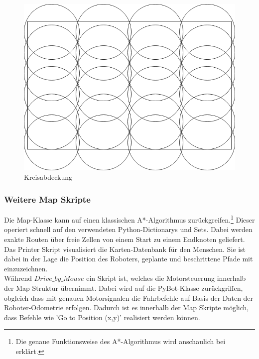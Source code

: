 \documentclass[twoside,11pt, a4paper]{report}
\begin{document}
	\begin{figure}[!htb]
		\centering
		\includegraphics[scale=0.25]{images/Kreis.png}
		\caption{Kreisabdeckung}
	\end{figure}
	
	\FloatBarrier
	\subsubsection{Weitere Map Skripte}
	Die Map-Klasse kann auf einen klassischen A*-Algorithmus zurückgreifen.\footnote{Die genaue Funktionsweise des A*-Algorithmus wird anschaulich bei \cite{RusNor2012} erklärt.}  Dieser operiert schnell auf den verwendeten Python-Dictionarys und Sets. Dabei werden exakte Routen über freie Zellen von einem Start zu einem Endknoten geliefert. \\
	Das Printer Skript visualisiert die Karten-Datenbank für den Menschen. Sie ist dabei in der Lage die Position des Roboters, geplante  und beschrittene Pfade mit einzuzeichnen.\\
	Während $Drive\_by\_Mouse$ ein Skript ist, welches die Motorsteuerung innerhalb der Map Struktur übernimmt. Dabei wird auf die PyBot-Klasse zurückgriffen, obgleich dass mit genauen Motorsignalen die Fahrbefehle auf Basis der Daten der Roboter-Odometrie erfolgen. Dadurch ist es innerhalb der Map Skripte möglich, dass Befehle wie 'Go to Position (x,y)' realisiert werden können. 
	
\end{document}
